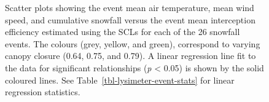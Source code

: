 \documentclass[
  letterpaper,
  DIV=11,
  numbers=noendperiod]{scrartcl}
\begin{document}
\begin{figure}[H]


\caption{\label{fig-scl-ip-avg-event}Scatter plots showing the event
mean air temperature, mean wind speed, and cumulative snowfall versus
the event mean interception efficiency estimated using the SCLs for each
of the 26 snowfall events. The colours (grey, yellow, and green),
correspond to varying canopy closure (0.64, 0.75, and 0.79). A linear
regression line fit to the data for significant relationships (\emph{p}
\textless{} 0.05) is shown by the solid coloured lines. See
Table~\ref{tbl-lysimeter-event-stats} for linear regression statistics.}

\end{figure}%
\end{document}
